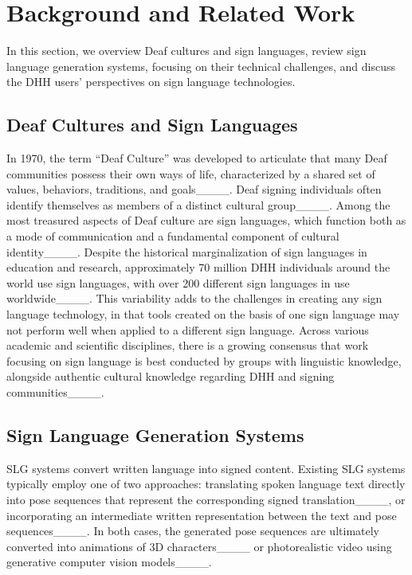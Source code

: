 \section{Background and Related Work}
\label{sec:rw}

In this section, we overview Deaf cultures and sign languages, review sign language generation systems, focusing on their technical challenges, and discuss the DHH users' perspectives on sign language technologies. 

\subsection{Deaf Cultures and Sign Languages}\label{subsec:rw_deaf_culture_asl}

In 1970, the term ``Deaf Culture'' was developed to articulate that many Deaf communities possess their own ways of life, characterized by a shared set of values, behaviors, traditions, and goals____. Deaf signing individuals often identify themselves as members of a distinct cultural group____. Among the most treasured aspects of Deaf culture are sign languages, which function both as a mode of communication and a fundamental component of cultural identity____. Despite the historical marginalization of sign languages in education and research, approximately 70 million DHH individuals around the world use sign languages, with over 200 different sign languages in use worldwide____. This variability adds to the challenges in creating any sign language technology, in that tools created on the basis of one sign language may not perform well when applied to a different sign language. Across various academic and scientific disciplines, there is a growing consensus that work focusing on sign language is best conducted by groups with linguistic knowledge, alongside authentic cultural knowledge regarding DHH and signing communities____.

\subsection{Sign Language Generation Systems}
\label{subsec:rw_SLG}

SLG systems convert written language into signed content. Existing SLG systems typically employ one of two approaches: translating spoken language text directly into pose sequences that represent the corresponding signed translation____, or incorporating an intermediate written representation between the text and pose sequences____. In both cases, the generated pose sequences are ultimately converted into animations of 3D characters____ or photorealistic video using generative computer vision models____. 

